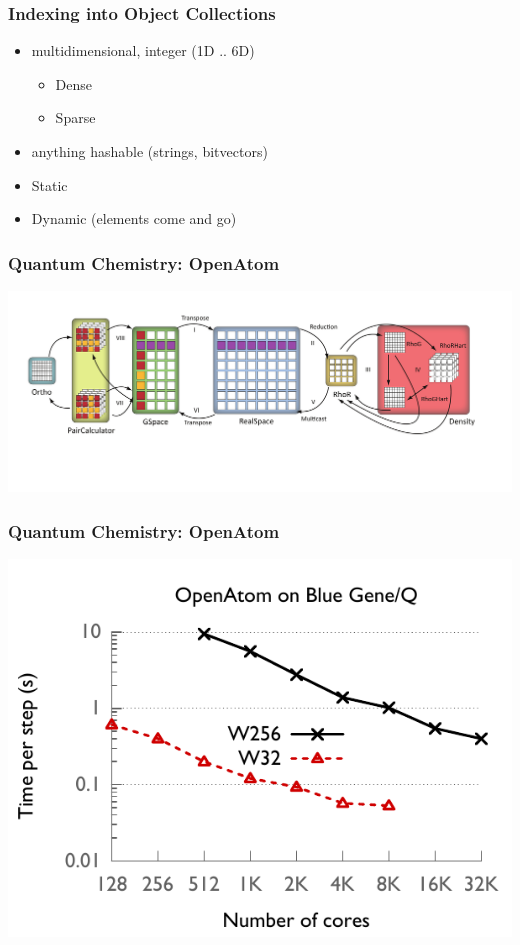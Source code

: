 \begin{frame}
\frametitle{Indexing into Object Collections}
    \begin{itemize}
       \item multidimensional, integer (1D .. 6D)
        \begin{itemize}
            \item Dense
            \item Sparse
        \end{itemize}
       \item anything hashable (strings, bitvectors)
       \item Static
       \item Dynamic (elements come and go)
    \end{itemize}
\end{frame}


\begin{frame}
\frametitle{Quantum Chemistry: OpenAtom}
\includegraphics[width=\textwidth]{../figures/openatom/control-flow.pdf}
\end{frame}


\begin{frame}
\frametitle{Quantum Chemistry: OpenAtom}
\includegraphics[width=\textwidth]{../figures/openatom/bgq.pdf}
\end{frame}



